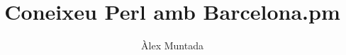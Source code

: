 \documentclass{beamer}
\title{Coneixeu Perl amb Barcelona.pm}
\author {Àlex Muntada}
\institute{
 	Barcelona Perl Mongers 
}
\begin{document}
    \begin{frame}
        \titlepage
    \end{frame}

\end{document}
